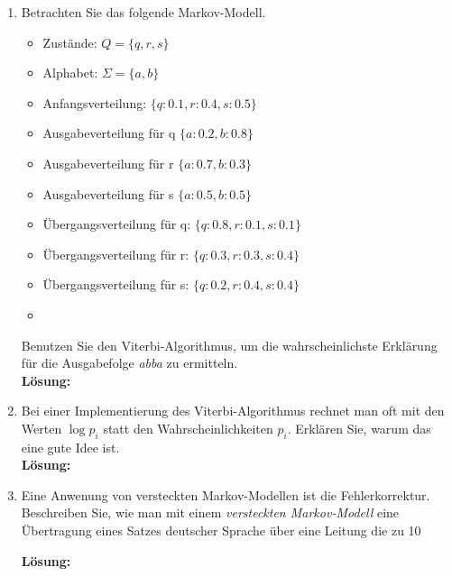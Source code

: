 \documentclass[11pt,a4paper,ngerman]{article}
\begin{document}
\begin{enumerate}[\bfseries (a)]


\item Betrachten Sie das folgende Markov-Modell.

\begin{itemize}
\item Zustände: $Q = \{ q,r,s\}$
\item Alphabet: $\Sigma = \{ a,b\}$
\item Anfangsverteilung: $\{ q : 0.1, r : 0.4, s : 0.5 \}$
\item Ausgabeverteilung für q $\{ a : 0.2, b : 0.8 \}$
\item Ausgabeverteilung für r $\{ a : 0.7, b : 0.3 \}$
\item Ausgabeverteilung für s $\{ a : 0.5, b : 0.5\}$
\item Übergangsverteilung für q: $\{ q : 0.8, r : 0.1, s : 0.1 \}$
\item Übergangsverteilung für r: $\{ q : 0.3, r : 0.3, s : 0.4 \}$
\item Übergangsverteilung für s: $\{ q : 0.2, r : 0.4, s : 0.4 \}$
\item
\end{itemize}

Benutzen Sie den Viterbi-Algorithmus, um die wahrscheinlichste Erklärung für die Ausgabefolge \emph{abba} zu ermitteln.\\

\textbf{Lösung:}


\item Bei einer Implementierung des Viterbi-Algorithmus rechnet man oft mit den Werten $\log p_i$ statt den Wahrscheinlichkeiten $p_i$. Erklären Sie, warum das eine gute Idee ist.\\

\textbf{Lösung:}


\item Eine Anwenung von versteckten Markov-Modellen ist die Fehlerkorrektur. Beschreiben Sie, wie man mit einem \emph{versteckten Markov-Modell} eine Übertragung eines Satzes deutscher Sprache über eine Leitung die zu 10%

\textbf{Lösung:}

\end{enumerate}

\label{LastPage}
\end{document}
